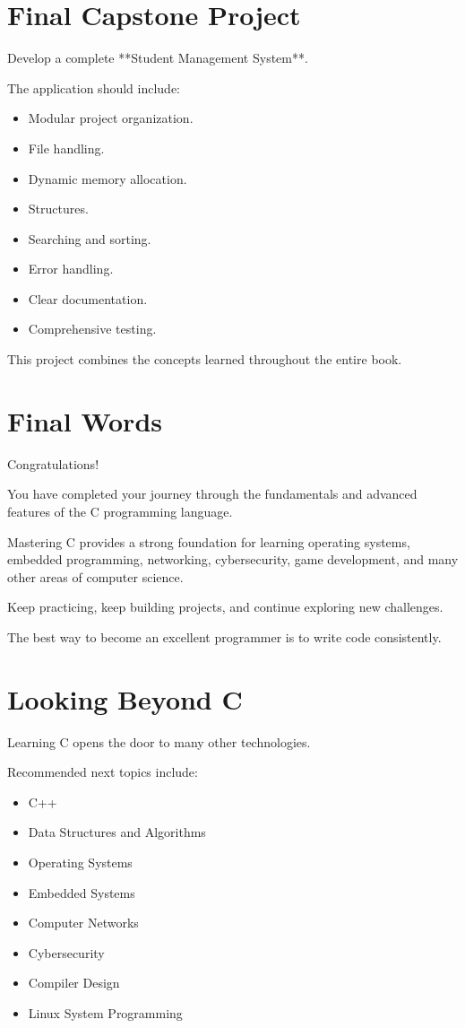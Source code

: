 \documentclass[12pt,openany]{book}
\begin{document}
\section{Final Capstone Project}

Develop a complete **Student Management System**.

The application should include:

\begin{itemize}
    \item Modular project organization.
    \item File handling.
    \item Dynamic memory allocation.
    \item Structures.
    \item Searching and sorting.
    \item Error handling.
    \item Clear documentation.
    \item Comprehensive testing.
\end{itemize}

This project combines the concepts learned throughout the entire book.

\section{Final Words}

Congratulations!

You have completed your journey through the fundamentals and advanced features of the C programming language.

Mastering C provides a strong foundation for learning operating systems, embedded programming, networking, cybersecurity, game development, and many other areas of computer science.

Keep practicing, keep building projects, and continue exploring new challenges.

The best way to become an excellent programmer is to write code consistently.

\section{Looking Beyond C}

Learning C opens the door to many other technologies.

Recommended next topics include:

\begin{itemize}
    \item C++
    \item Data Structures and Algorithms
    \item Operating Systems
    \item Embedded Systems
    \item Computer Networks
    \item Cybersecurity
    \item Compiler Design
    \item Linux System Programming
\end{itemize}
\end{document}
